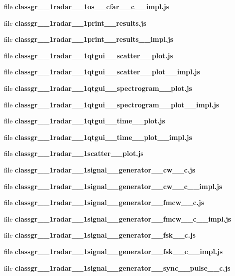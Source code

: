 \begin{DoxyCompactItemize}
\item 
file {\bf classgr\+\_\+\_\+1radar\+\_\+\_\+1os\+\_\+\+\_\+cfar\+\_\+\+\_\+c\+\_\+\+\_\+impl.\+js}
\item 
file {\bf classgr\+\_\+\_\+1radar\+\_\+\_\+1print\+\_\+\+\_\+results.\+js}
\item 
file {\bf classgr\+\_\+\_\+1radar\+\_\+\_\+1print\+\_\+\+\_\+results\+\_\+\+\_\+impl.\+js}
\item 
file {\bf classgr\+\_\+\_\+1radar\+\_\+\_\+1qtgui\+\_\+\+\_\+scatter\+\_\+\+\_\+plot.\+js}
\item 
file {\bf classgr\+\_\+\_\+1radar\+\_\+\_\+1qtgui\+\_\+\+\_\+scatter\+\_\+\+\_\+plot\+\_\+\+\_\+impl.\+js}
\item 
file {\bf classgr\+\_\+\_\+1radar\+\_\+\_\+1qtgui\+\_\+\+\_\+spectrogram\+\_\+\+\_\+plot.\+js}
\item 
file {\bf classgr\+\_\+\_\+1radar\+\_\+\_\+1qtgui\+\_\+\+\_\+spectrogram\+\_\+\+\_\+plot\+\_\+\+\_\+impl.\+js}
\item 
file {\bf classgr\+\_\+\_\+1radar\+\_\+\_\+1qtgui\+\_\+\+\_\+time\+\_\+\+\_\+plot.\+js}
\item 
file {\bf classgr\+\_\+\_\+1radar\+\_\+\_\+1qtgui\+\_\+\+\_\+time\+\_\+\+\_\+plot\+\_\+\+\_\+impl.\+js}
\item 
file {\bf classgr\+\_\+\_\+1radar\+\_\+\_\+1scatter\+\_\+\+\_\+plot.\+js}
\item 
file {\bf classgr\+\_\+\_\+1radar\+\_\+\_\+1signal\+\_\+\+\_\+generator\+\_\+\+\_\+cw\+\_\+\+\_\+c.\+js}
\item 
file {\bf classgr\+\_\+\_\+1radar\+\_\+\_\+1signal\+\_\+\+\_\+generator\+\_\+\+\_\+cw\+\_\+\+\_\+c\+\_\+\+\_\+impl.\+js}
\item 
file {\bf classgr\+\_\+\_\+1radar\+\_\+\_\+1signal\+\_\+\+\_\+generator\+\_\+\+\_\+fmcw\+\_\+\+\_\+c.\+js}
\item 
file {\bf classgr\+\_\+\_\+1radar\+\_\+\_\+1signal\+\_\+\+\_\+generator\+\_\+\+\_\+fmcw\+\_\+\+\_\+c\+\_\+\+\_\+impl.\+js}
\item 
file {\bf classgr\+\_\+\_\+1radar\+\_\+\_\+1signal\+\_\+\+\_\+generator\+\_\+\+\_\+fsk\+\_\+\+\_\+c.\+js}
\item 
file {\bf classgr\+\_\+\_\+1radar\+\_\+\_\+1signal\+\_\+\+\_\+generator\+\_\+\+\_\+fsk\+\_\+\+\_\+c\+\_\+\+\_\+impl.\+js}
\item 
file {\bf classgr\+\_\+\_\+1radar\+\_\+\_\+1signal\+\_\+\+\_\+generator\+\_\+\+\_\+sync\+\_\+\+\_\+pulse\+\_\+\+\_\+c.\+js}

\end{DoxyCompactItemize}
